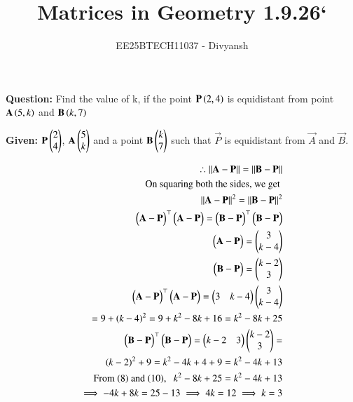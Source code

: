 \documentclass[journal,12pt,onecolumn]{IEEEtran}
\title{Matrices in Geometry 1.9.26`}
\author{EE25BTECH11037 - Divyansh}
\theoremstyle{remark}
\begin{document}
\vspace{3cm}
\maketitle
{\let\newpage\relax\maketitle}
\textbf{Question: }
Find the value of k, if the point $\mathbf{P}\left(2,4\right)$ is equidistant from point $\mathbf{A}\left(5,k\right)$ and $\mathbf{B}\left(k,7\right)$

\textbf{Given: } 
$\mathbf{P}\begin{pmatrix}2\\4\end{pmatrix}$, $\mathbf{A}\begin{pmatrix}5\\k\end{pmatrix}$ and a point $\mathbf{B} \begin{pmatrix}k \\ 7\end{pmatrix}$ such that $\vec{P}$ is equidistant from $\vec{A}$ and $\vec{B}$. 

\begin{align}
    \therefore \left\lVert\mathbf{A}-\mathbf{P}\right\rVert=\left\lVert\mathbf{B}-\mathbf{P}\right\rVert\\
    \text{On squaring both the sides, we get }\\
    \left\lVert\mathbf{A}-\mathbf{P}\right\rVert^2=\left\lVert\mathbf{B}-\mathbf{P}\right\rVert^2\\
    \begin{pmatrix}\mathbf{A}-\mathbf{P}\end{pmatrix}^{\top}\begin{pmatrix}\mathbf{A}-\mathbf{P}\end{pmatrix}=\begin{pmatrix}\mathbf{B}-\mathbf{P}\end{pmatrix}^{\top}\begin{pmatrix}\mathbf{B}-\mathbf{P}\end{pmatrix}\\
    \begin{pmatrix}\mathbf{A}-\mathbf{P}\end{pmatrix}=\begin{pmatrix}3 \\ k-4\end{pmatrix}\\
    \begin{pmatrix}\mathbf{B}-\mathbf{P}\end{pmatrix}=\begin{pmatrix}k-2 \\ 3\end{pmatrix}\\
    \begin{pmatrix}\mathbf{A}-\mathbf{P}\end{pmatrix}^{\top}\begin{pmatrix}\mathbf{A}-\mathbf{P}\end{pmatrix}=\begin{pmatrix}3 & k-4\end{pmatrix}\begin{pmatrix}3 \\ k-4\end{pmatrix}\\=9+\left(k-4\right)^2=9 + k^2 -8k + 16 =k^2 - 8k + 25\\
    \begin{pmatrix}\mathbf{B}-\mathbf{P}\end{pmatrix}^{\top}\begin{pmatrix}\mathbf{B}-\mathbf{P}\end{pmatrix}=\begin{pmatrix}k-2 & 3\end{pmatrix}\begin{pmatrix}k-2 \\ 3\end{pmatrix}=\\ \left(k-2\right)^2 + 9=k^2 - 4k + 4+ 9=k^2 -4k+13\\
    \text{From \ensuremath{\left(8\right)} and \ensuremath{\left(10\right)}, \ \ } k^2 - 8k + 25=k^2 -4k+13\\
    \implies -4k+ 8k =25 -13\implies 4k=12 \implies k=3
\end{align}
\end{document}

